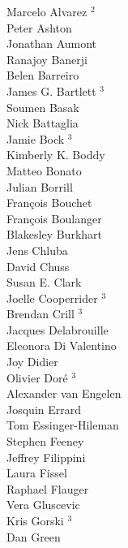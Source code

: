 \documentclass[PICOReport.tex]{subfiles}
\begin{document}
{{\begin{multicols}{4}
Marcelo Alvarez $^2$                \\
Peter Ashton                    \\
Jonathan Aumont                 \\
Ranajoy Banerji                 \\
Belen Barreiro                  \\
James G. Bartlett $^3$              \\
Soumen Basak                    \\
Nick Battaglia              \\
Jamie Bock $^3$                     \\
Kimberly K. Boddy               \\
Matteo Bonato                   \\
Julian Borrill                  \\
Fran\c{c}ois Bouchet            \\
Fran\c{c}ois Boulanger          \\
Blakesley Burkhart              \\
Jens Chluba                     \\
David Chuss                     \\
Susan E. Clark                  \\
Joelle Cooperrider $^3$         \\
Brendan Crill $^3$                 \\
Jacques Delabrouille            \\
Eleonora Di Valentino           \\
Joy Didier                      \\
Olivier Dor\'e  $^3$                 \\
Alexander van Engelen           \\
Josquin Errard                  \\
Tom Essinger-Hileman            \\
Stephen Feeney                  \\
Jeffrey Filippini               \\
Laura Fissel                    \\
Raphael Flauger                 \\
Vera Gluscevic                  \\
Kris Gorski  $^3$                   \\
Dan Green                       \\

\end{multicols}}}
\end{document}
